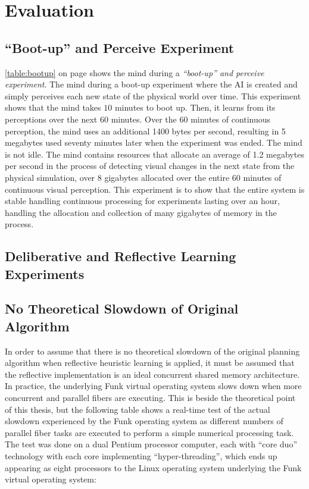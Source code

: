 \chapter{Evaluation}
\label{chapter:evaulation}

\section{``Boot-up'' and Perceive Experiment}

\autoref{table:bootup} on page \pageref{table:bootup} shows the mind
during a \emph{``boot-up'' and perceive experiment}.  The mind during
a boot-up experiment where the AI is created and simply perceives each
new state of the physical world over time.  This experiment shows that
the mind takes $10$ minutes to boot up.  Then, it learns from its
perceptions over the next $60$ minutes.  Over the $60$ minutes of
continuous perception, the mind uses an additional 1400 bytes per
second, resulting in 5 megabytes used seventy minutes later when the
experiment was ended.  The mind is not idle.  The mind contains
resources that allocate an average of 1.2 megabytes per second in the
process of detecting visual changes in the next state from the
physical simulation, over 8 gigabytes allocated over the entire 60
minutes of continuous visual perception.  This experiment is to show
that the entire system is stable handling continuous processing for
experiments lasting over an hour, handling the allocation and
collection of many gigabytes of memory in the process.


\section{Deliberative and Reflective Learning Experiments}


\section{No Theoretical Slowdown of Original Algorithm}

In order to assume that there is no theoretical slowdown of the
original planning algorithm when reflective heuristic learning is
applied, it must be assumed that the reflective implementation is an
ideal concurrent shared memory architecture.  In practice, the
underlying Funk virtual operating system slows down when more
concurrent and parallel fibers are executing.  This is beside the
theoretical point of this thesis, but the following table shows a
real-time test of the actual slowdown experienced by the Funk
operating system as different numbers of parallel fiber tasks are
executed to perform a simple numerical processing task.  The test was
done on a dual Pentium processor computer, each with ``core duo''
technology with each core implementing ``hyper-threading'', which ends
up appearing as eight processors to the Linux operating system
underlying the Funk virtual operating system:

